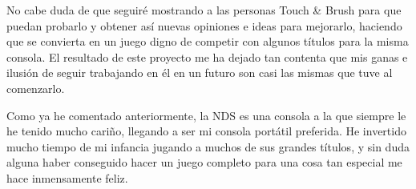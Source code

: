 \vspace{0.5cm}

No cabe duda de que seguiré mostrando a las personas Touch \& Brush para que puedan probarlo y obtener así nuevas opiniones e ideas para mejorarlo, haciendo que se convierta en un juego digno de competir con algunos títulos para la misma consola. El resultado de este proyecto me ha dejado tan contenta que mis ganas e ilusión de seguir trabajando en él en un futuro son casi las mismas que tuve al comenzarlo.

\vspace{0.5cm}

Como ya he comentado anteriormente, la NDS es una consola a la que siempre le he tenido mucho cariño, llegando a ser mi consola portátil preferida. He invertido mucho tiempo de mi infancia jugando a muchos de sus grandes títulos, y sin duda alguna haber conseguido hacer un juego completo para una cosa tan especial me hace inmensamente feliz.
